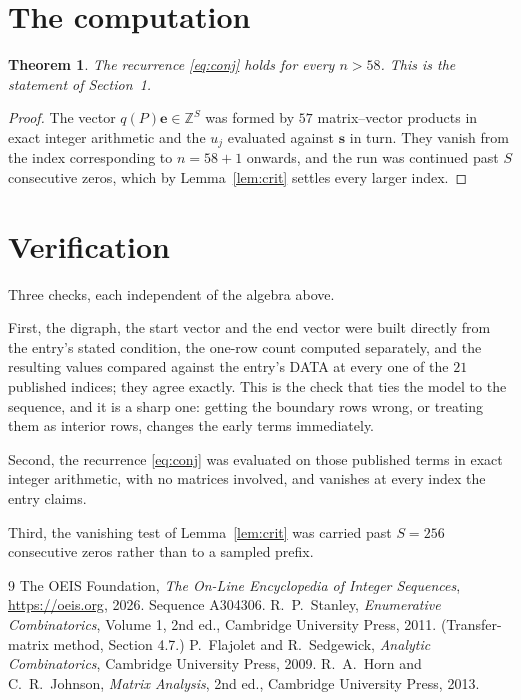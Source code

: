 \documentclass[11pt,a4paper]{article}
\theoremstyle{plain}
\newtheorem{theorem}{Theorem}
\theoremstyle{definition}
\begin{document}
\section{The computation}

\begin{theorem}
The recurrence \eqref{eq:conj} holds for every $n>58$. This is the statement of
Section~1.
\end{theorem}

\begin{proof}
The vector $q(P)\mathbf{e}\in\mathbb{Z}^{S}$ was formed by $57$ matrix--vector
products in exact integer arithmetic and the $u_j$ evaluated against $\mathbf{s}$ in turn.
They vanish from the index corresponding to $n=58+1$ onwards, and the run was continued
past $S$ consecutive zeros, which by Lemma~\ref{lem:crit} settles every larger index.
\end{proof}

\section{Verification}

Three checks, each independent of the algebra above.

First, the digraph, the start vector and the end vector were built directly from the
entry's stated condition, the one-row count computed separately, and the resulting values
compared against the entry's DATA at every one of the $21$ published indices; they
agree exactly. This is the check that ties the model to the sequence, and it is a sharp one:
getting the boundary rows wrong, or treating them as interior rows, changes the early terms
immediately.

Second, the recurrence \eqref{eq:conj} was evaluated on those published terms in exact
integer arithmetic, with no matrices involved, and vanishes at every index the entry claims.

Third, the vanishing test of Lemma~\ref{lem:crit} was carried past $S=256$ consecutive
zeros rather than to a sampled prefix.

\begin{thebibliography}{9}
 The OEIS Foundation, \emph{The On-Line Encyclopedia of Integer
Sequences}, \url{https://oeis.org}, 2026. Sequence A304306.
 R.~P.~Stanley, \emph{Enumerative Combinatorics}, Volume 1, 2nd ed.,
Cambridge University Press, 2011. (Transfer-matrix method, Section 4.7.)
 P.~Flajolet and R.~Sedgewick, \emph{Analytic Combinatorics}, Cambridge
University Press, 2009.
 R.~A.~Horn and C.~R.~Johnson, \emph{Matrix Analysis}, 2nd ed., Cambridge
University Press, 2013.
\end{thebibliography}
\end{document}

